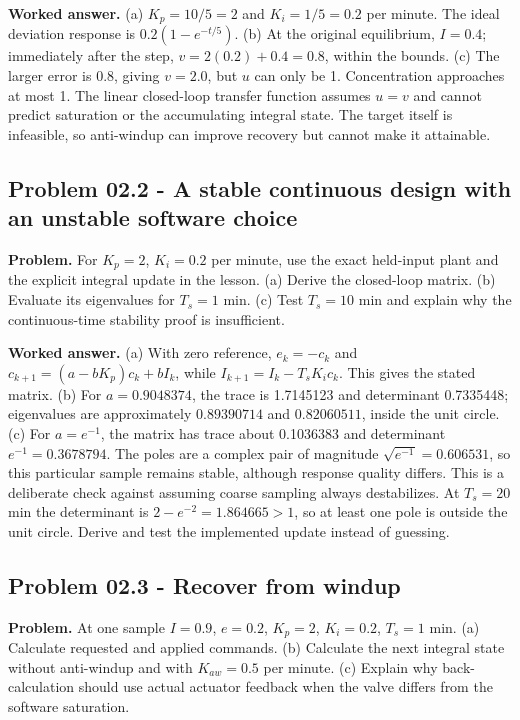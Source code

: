 \documentclass[11pt,a4paper]{article}
\begin{document}
\textbf{Worked answer.} (a) $K_p=10/5=2$ and $K_i=1/5=0.2$ per minute. The ideal deviation response is $0.2(1-e^{-t/5})$. (b) At the original equilibrium, $I=0.4$; immediately after the step, $v=2(0.2)+0.4=0.8$, within the bounds. (c) The larger error is 0.8, giving $v=2.0$, but $u$ can only be 1. Concentration approaches at most 1. The linear closed-loop transfer function assumes $u=v$ and cannot predict saturation or the accumulating integral state. The target itself is infeasible, so anti-windup can improve recovery but cannot make it attainable.

\subsection{Problem 02.2 - A stable continuous design with an unstable software choice}
\textbf{Problem.} For $K_p=2$, $K_i=0.2$ per minute, use the exact held-input plant and the explicit integral update in the lesson. (a) Derive the closed-loop matrix. (b) Evaluate its eigenvalues for $T_s=1$ min. (c) Test $T_s=10$ min and explain why the continuous-time stability proof is insufficient.


\textbf{Worked answer.} (a) With zero reference, $e_k=-c_k$ and $c_{k+1}=(a-bK_p)c_k+bI_k$, while $I_{k+1}=I_k-T_sK_ic_k$. This gives the stated matrix. (b) For $a=0.9048374$, the trace is 1.7145123 and determinant 0.7335448; eigenvalues are approximately $0.89390714$ and $0.82060511$, inside the unit circle. (c) For $a=e^{-1}$, the matrix has trace about 0.1036383 and determinant $e^{-1}=0.3678794$. The poles are a complex pair of magnitude $\sqrt{e^{-1}}=0.606531$, so this particular sample remains stable, although response quality differs. This is a deliberate check against assuming coarse sampling always destabilizes. At $T_s=20$ min the determinant is $2-e^{-2}=1.864665>1$, so at least one pole is outside the unit circle. Derive and test the implemented update instead of guessing.

\subsection{Problem 02.3 - Recover from windup}
\textbf{Problem.} At one sample $I=0.9$, $e=0.2$, $K_p=2$, $K_i=0.2$, $T_s=1$ min. (a) Calculate requested and applied commands. (b) Calculate the next integral state without anti-windup and with $K_{aw}=0.5$ per minute. (c) Explain why back-calculation should use actual actuator feedback when the valve differs from the software saturation.
\end{document}
